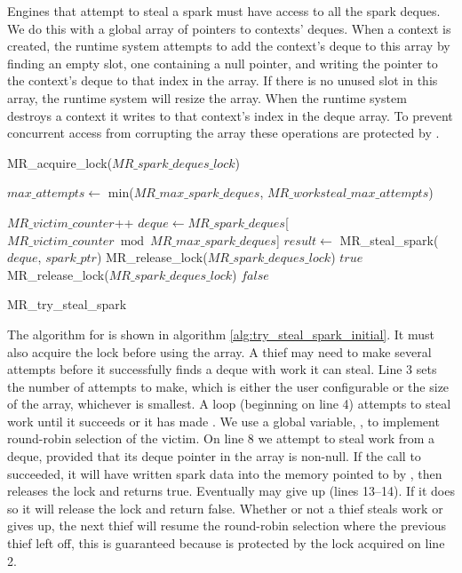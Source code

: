 Engines that attempt to steal a spark must have access to all the spark
deques.
We do this with a global array of pointers to contexts' deques.
When a context is created,
the runtime system attempts to add the context's deque to this array by
finding an empty slot,
one containing a null pointer,
and writing the pointer to the context's deque to that index in the array.
If there is no unused slot in this array, the runtime system will resize the
array.
When the runtime system destroys a context it writes \NULL to that context's
index in the deque array.
To prevent concurrent access from corrupting the array these operations are
protected by .

\begin{algorithm}
\begin{algorithmic}[1]
  \State MR\_acquire\_lock($MR\_spark\_deques\_lock$)

  \State $max\_attempts \gets$ min($MR\_max\_spark\_deques$,
    $MR\_worksteal\_max\_attempts$)

    \State $MR\_victim\_counter$++
    \State $deque \gets
       MR\_spark\_deques$[$MR\_victim\_counter \bmod MR\_max\_spark\_deques$]
      \State $result \gets$ MR\_steal\_spark($deque$, $spark\_ptr$)
        \State MR\_release\_lock($MR\_spark\_deques\_lock$)
        \State \Return $true$
      \EndIf
    \EndIf
  \EndFor
  \State MR\_release\_lock($MR\_spark\_deques\_lock$)
  \State \Return $false$
\EndProcedure
\end{algorithmic}
\caption{MR\_try\_steal\_spark}
\label{alg:try_steal_spark_initial}
\end{algorithm}

The algorithm for \trystealspark is shown in
algorithm \ref{alg:try_steal_spark_initial}.
It must also acquire the lock before using the array.
A thief may need to make several attempts before it successfully finds a
deque with work it can steal.
Line 3 sets the number of attempts to make, which is either the user
configurable  or the size of the array,
whichever is smallest.
A loop (beginning on line 4) attempts to steal work until it succeeds or it
has made .
We use a global variable, ,
to implement round-robin selection of the victim.
On line 8 we attempt to steal work from a deque,
provided that its deque pointer in the array is non-null.
If the call to \steal succeeded,
it will have written spark data into the memory pointed to by
,
then \trystealspark releases the lock and returns true.
Eventually \trystealspark may give up (lines 13--14).
If it does so it will release the lock and return false.
Whether or not a thief steals work or gives up,
the next thief will resume the round-robin selection where the previous
thief left off,
this is guaranteed because  is protected by the
lock acquired on line 2.

